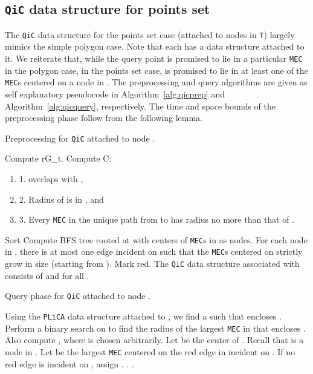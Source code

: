 \documentclass[12pt]{llncs}
\begin{document}
\subsection{{\tt QiC} data structure for points set} \label{sec:QiC-1}

The {\tt QiC} data structure for the points set case (attached to nodes in {\tt T}) largely mimics the simple polygon case. Note that each  has a  data structure attached to it. We reiterate that, while the query point  is promised to lie in a particular {\tt MEC} in the polygon case, in the points set case,  is promised to lie in at least one of the {\tt MEC}s centered on a node in . 
The preprocessing and query algorithms are given as self explanatory pseudocode in Algorithm\ \ref{alg:qicprep} and Algorithm\ \ref{alg:qicquery}, respectively. The time and space bounds of the preprocessing phase follow from the following lemma.

\begin{algorithm}[h!]
\caption{Preprocessing for {\tt QiC} attached to node .}
\label{alg:qicprep}
\begin{algorithmic}[1]
\STATE Compute rG_t.
\FORALL{}
\STATE Compute C:
\begin{enumerate}
\item[] 1.  overlaps with ,
\item[] 2. Radius of  is in , and
\item[] 3. Every {\tt MEC} in the unique path from  to  has radius no more than that of .
\end{enumerate}
\STATE Sort 
\STATE Compute BFS tree  rooted at  with centers of {\tt MEC}s  in  as nodes.
\STATE For each node  in , there is at most one edge  incident on  such that the {\tt MEC}s centered on  strictly grow in size (starting from ). Mark  red.
\ENDFOR
\STATE The {\tt QiC} data structure associated with  consists of   and  for all .
\end{algorithmic}
\end{algorithm}

\begin{algorithm}[h!]
\caption{Query phase for {\tt QiC} attached to node .}
\label{alg:qicquery}
\begin{algorithmic}[1]
\STATE Using the {\tt PLiCA} data structure  attached to , we find a   such that  encloses .
\STATE Perform a binary search on  to find the radius  of the largest {\tt MEC} in  that encloses . Also compute  
\STATE , where  is chosen arbitrarily.
\FORALL{}
\STATE Let  be the center of . Recall that  is a node in .
\STATE Let  be the largest {\tt MEC} centered on the red edge in  incident on . If no red edge is incident on , assign .
\STATE .
\ENDIF
\ENDFOR
\RETURN .
\end{algorithmic}
\end{algorithm}
\end{document}
